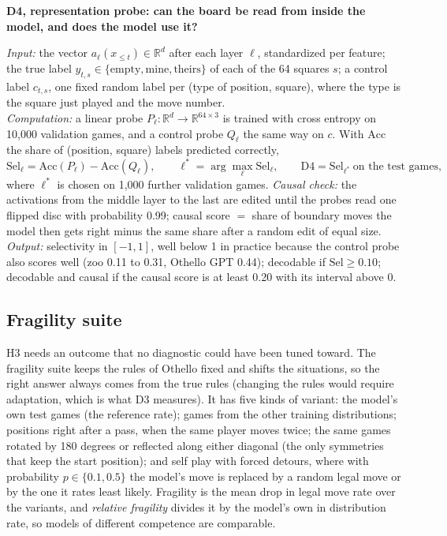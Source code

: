 \documentclass[11pt]{scrartcl}
\newenvironment{defbox}[1]{%
    \par\medskip\noindent
    \begin{lrbox}{\defboxcontent}%
    \begin{minipage}{\dimexpr\linewidth-2\fboxsep-2\fboxrule\relax}%
    \textbf{#1}\par\smallskip\small
}{%
    \end{minipage}%
    \end{lrbox}%
    \fbox{\usebox{\defboxcontent}}\par\medskip
}
\begin{document}
\begin{defbox}{D4, representation probe: can the board be read from inside the model, and does the model use it?}
\textit{Input:} the vector $a_\ell(x_{\le t})\in\mathbb{R}^{d}$ after each layer $\ell$, standardized per
feature; the true label $y_{t,s}\in\{\text{empty},\text{mine},\text{theirs}\}$ of each of the 64 squares $s$;
a control label $c_{t,s}$, one fixed random label per (type of position, square), where the type is the square
just played and the move number.\\[2pt]
\textit{Computation:} a linear probe $P_\ell:\mathbb{R}^{d}\to\mathbb{R}^{64\times3}$ is trained with cross
entropy on 10,000 validation games, and a control probe $Q_\ell$ the same way on $c$. With
$\mathrm{Acc}$ the share of (position, square) labels predicted correctly,
\[
  \mathrm{Sel}_\ell=\mathrm{Acc}(P_\ell)-\mathrm{Acc}(Q_\ell),\qquad
  \ell^{*}=\arg\max_\ell \mathrm{Sel}_\ell,\qquad
  \mathrm{D4}=\mathrm{Sel}_{\ell^{*}}\ \text{on the test games},
\]
where $\ell^{*}$ is chosen on 1,000 further validation games.
\textit{Causal check:} the activations from the middle layer to the last are edited until the probes read one
flipped disc with probability 0.99; causal score $=$ share of boundary moves the model then gets right minus
the same share after a random edit of equal size.\\[2pt]
\textit{Output:} selectivity in $[-1,1]$, well below 1 in practice because the control probe also scores well
(zoo 0.11 to 0.31, Othello GPT 0.44);
decodable if $\mathrm{Sel}\ge0.10$; decodable and causal if the causal score is at least 0.20 with its interval
above 0.
\end{defbox}

\subsection{Fragility suite}
\label{sec:fragility}

H3 needs an outcome that no diagnostic could have been tuned toward. The fragility suite keeps the rules of
Othello fixed and shifts the situations, so the right answer always comes from the true rules (changing the
rules would require adaptation, which is what D3 measures). It has five kinds of variant: the model's own test
games (the reference rate); games from the other training distributions; positions right after a pass, when
the same player moves twice; the same games rotated by 180 degrees or reflected along either diagonal (the
only symmetries that keep the start position); and self play with forced detours, where with probability
$p\in\{0.1, 0.5\}$ the model's move is replaced by a random legal move or by the one it rates least likely.
Fragility is the mean drop in legal move rate over the variants, and \emph{relative fragility} divides it by
the model's own in distribution rate, so models of different competence are comparable.
\end{document}
